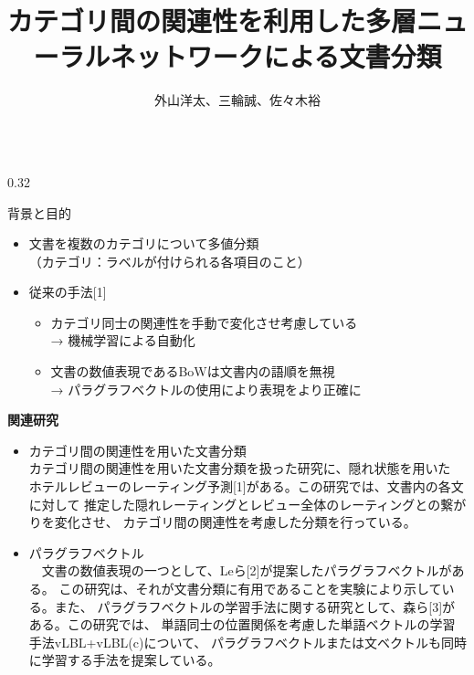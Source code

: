 \documentclass[10pt,unicode]{beamer}
\title{カテゴリ間の関連性を利用した多層ニューラルネットワークによる文書分類}
\author{外山洋太、三輪誠、佐々木裕}
\institute{豊田工業大学 工学部 先端工学基礎学科}
\date{}
\newcommand{\columnsize}{0.32}
\newcommand{\itemtitle}[1]{{\large #1} \\}
\begin{document}
\begin{frame}{}
\maketitle
\begin{columns}[t]

\begin{column}{\columnsize\textwidth} %
  \begin{block}{背景と目的}
    \begin{itemize}
      \item 文書を複数のカテゴリについて多値分類 \\
      （カテゴリ：ラベルが付けられる各項目のこと）
      \item 従来の手法[1]
        \begin{itemize}
        \item カテゴリ同士の関連性を手動で変化させ考慮している \\
        → 機械学習による自動化
        \item 文書の数値表現であるBoWは文書内の語順を無視 \\
        → パラグラフベクトルの使用により表現をより正確に
        \end{itemize}
    \end{itemize}
  \end{block}

  \begin{block}{\bf 関連研究}
    \begin{itemize}
    \item \itemtitle{カテゴリ間の関連性を用いた文書分類}
    カテゴリ間の関連性を用いた文書分類を扱った研究に、隠れ状態を用いた
    ホテルレビューのレーティング予測[1]がある。この研究では、文書内の各文に対して
    推定した隠れレーティングとレビュー全体のレーティングとの繋がりを変化させ、
    カテゴリ間の関連性を考慮した分類を行っている。
    \item \itemtitle{パラグラフベクトル}
    　文書の数値表現の一つとして、Leら[2]が提案したパラグラフベクトルがある。
    この研究は、それが文書分類に有用であることを実験により示している。また、
    パラグラフベクトルの学習手法に関する研究として、森ら[3]がある。この研究では、
    単語同士の位置関係を考慮した単語ベクトルの学習手法vLBL+vLBL(c)について、
    パラグラフベクトルまたは文ベクトルも同時に学習する手法を提案している。
    \end{itemize}
  \end{block}
\end{column} %


\end{columns}
\end{frame}
\end{document}
